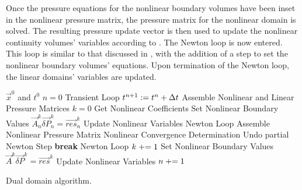 Once the pressure equations for the nonlinear boundary volumes have been inset in the nonlinear pressure matrix, the pressure matrix for the nonlinear domain is solved.
The resulting pressure update vector is then used to update the nonlinear continuity volumes' variables according to .
The Newton loop is now entered.
This loop is similar to that discussed in , with the addition of a step to set the nonlinear boundary volumes' equations.
Upon termination of the Newton loop, the linear domains' variables are updated.

\begin{algo}[ht!]
\setlength{\baselineskip}{0.625\baselineskip}
\begin{algorithmic}[1]
\Require $\vec{x}^{0}$ and $t^{0}$
\Set $n = 0$
\Loop \; Transient Loop
    \Set $t^{n+1} : = t^{n} + \dt{}$
	\Algorithm Assemble Nonlinear and Linear Pressure Matrices	 
	    \Set $k = 0$
		\Algorithm Get Nonlinear Coefficients 
		\Algorithm Set Nonlinear Boundary Values 
		\Solve $\vec{A}^{k}_{n} \vec{\delta P}_{n}^{k} = \vec{res}_{n}^{k}$	
		\Algorithm Update Nonlinear Variables  
	    \Loop \; Newton Loop
			\Algorithm Assemble Nonlinear Pressure Matrix 
			\Algorithm Nonlinear Convergence Determination 
				\State Undo partial Newton Step
				\State \textbf{break} Newton Loop 
			\EndIf		
			\Set $k \mathrel{+}= 1$
			\Algorithm Set Nonlinear Boundary Values 
			\Solve $\vec{A}^{k} \vec{\delta P}^{k} = \vec{res}^{k}$
			\Algorithm Update Nonlinear Variables 
		\EndLoop
	\EndIf
	 
	\Set $n \mathrel{+}= 1$
\EndLoop
\end{algorithmic}
\caption{Dual domain \cobra{} algorithm.}
\label{alg:domDecompAlgorithm}
\end{algo}

